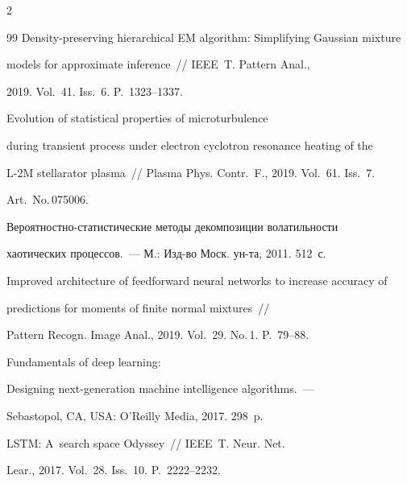 \begin{multicols}{2}
{{\begin{thebibliography}{99}
Density-preserving hierarchical EM algorithm: Simplifying Gaussian mixture

models for approximate inference~// IEEE~T. Pattern Anal., 

2019. Vol.~41. Iss.~6. P.~1323--1337.



   

Evolution of statistical properties of microturbulence 

during transient process under electron cyclotron resonance heating of the 

L-2M stellarator plasma~// Plasma Phys. Contr.~F., 2019. Vol.~61. Iss.~7. 

Art.~No.\,075006.



   

Ве\-ро\-ят\-но\-ст\-но-ста\-ти\-сти\-че\-ские методы декомпозиции волатильности 

хаотических процессов.~--- М.: Изд-во Моск. ун-та, 2011. 512~с.



   

Improved architecture of feedforward neural networks to increase accuracy of  

predictions for moments of finite normal mixtures~// 

Pattern Recogn. Image Anal., 2019. Vol.~29. No.\,1. P.~79--88.



   Fundamentals of deep learning: 

Designing next-generation machine intelligence algorithms.~--- 

Sebastopol, CA, USA: O'Reilly Media, 2017. 298~p.





LSTM: A~search space Odyssey~// IEEE~T. Neur. Net. 

Lear., 2017. Vol.~28. Iss.~10. P.~2222--2232.




\end{thebibliography}}}
\end{multicols}
